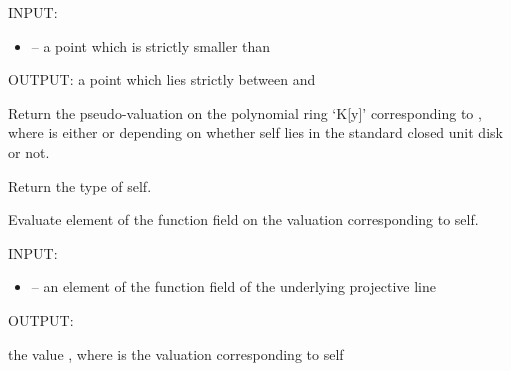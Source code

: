 \documentclass[letterpaper,10pt,english]{sphinxmanual}
\begin{document}
\begin{fulllineitems}
\begin{fulllineitems}
INPUT:
\begin{itemize}
\item {} 
 -- a point which is strictly smaller than 

\end{itemize}

OUTPUT: a point which lies strictly between  and 

\end{fulllineitems}


\begin{fulllineitems}
\label{berkovich_line:mclf.berkovich.berkovich_line.TypeIIPointOnBerkovichLine.pseudovaluation_on_polynomial_ring}
Return the pseudo-valuation on the polynomial ring `K{[}y{]}'
corresponding to , where  is either  or  depending
on whether self lies in the standard closed unit disk or not.

\end{fulllineitems}


\begin{fulllineitems}
\label{berkovich_line:mclf.berkovich.berkovich_line.TypeIIPointOnBerkovichLine.type}
Return the type of self.

\end{fulllineitems}


\begin{fulllineitems}
\label{berkovich_line:mclf.berkovich.berkovich_line.TypeIIPointOnBerkovichLine.v}
Evaluate element of the function field on the valuation corresponding to self.

INPUT:
\begin{itemize}
\item {} 
 -- an element of the function field of the underlying projective line

\end{itemize}

OUTPUT:

the value , where  is the valuation corresponding to self

\end{fulllineitems}


\end{fulllineitems}
\end{document}
